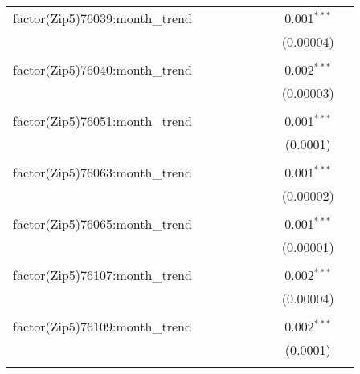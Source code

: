 \begin{table}[H]
{\begin{tabular}{@{\extracolsep{5pt}}lcccccccc}
  factor(Zip5)76039:month\_trend &  &  &  &  &  &  & 0.001$^{***}$ &  \\  

   &  &  &  &  &  &  & (0.00004) &  \\  

   & & & & & & & & \\  

  factor(Zip5)76040:month\_trend &  &  &  &  &  &  & 0.002$^{***}$ &  \\  

   &  &  &  &  &  &  & (0.00003) &  \\  

   & & & & & & & & \\  

  factor(Zip5)76051:month\_trend &  &  &  &  &  &  & 0.001$^{***}$ &  \\  

   &  &  &  &  &  &  & (0.0001) &  \\  

   & & & & & & & & \\  

  factor(Zip5)76063:month\_trend &  &  &  &  &  &  & 0.001$^{***}$ &  \\  

   &  &  &  &  &  &  & (0.00002) &  \\  

   & & & & & & & & \\  

  factor(Zip5)76065:month\_trend &  &  &  &  &  &  & 0.001$^{***}$ &  \\  

   &  &  &  &  &  &  & (0.00001) &  \\  

   & & & & & & & & \\  

  factor(Zip5)76107:month\_trend &  &  &  &  &  &  & 0.002$^{***}$ &  \\  

   &  &  &  &  &  &  & (0.00004) &  \\  

   & & & & & & & & \\  

  factor(Zip5)76109:month\_trend &  &  &  &  &  &  & 0.002$^{***}$ &  \\  

   &  &  &  &  &  &  & (0.0001) &  \\  

   & & & & & & & & \\  


\end{tabular}}
\end{table}
